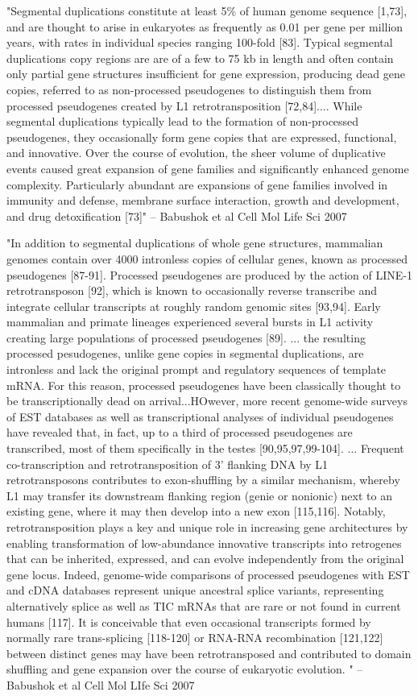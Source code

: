 \documentclass[10pt]{article}
\begin{document}
"Segmental duplications constitute at least 5\% of human genome sequence [1,73], and are thought to arise in eukaryotes as frequently as 0.01 per gene per million years, with rates in individual species ranging 100-fold [83].  Typical segmental duplications copy regions are are of a few to 75 kb in length and often contain only partial gene structures insufficient for gene expression, producing dead gene copies, referred to as non-processed pseudogenes to distinguish them from processed pseudogenes created by L1 retrotransposition [72,84].... While segmental duplications typically lead to the formation of non-processed pseudogenes, they occasionally form gene copies that are expressed, functional, and innovative.  Over the course of evolution, the sheer volume of duplicative events caused great expansion of gene families and significantly enhanced genome complexity.  Particularly abundant are expansions of gene families involved in immunity and defense, membrane surface interaction, growth and development, and drug detoxification [73]"  -- Babushok et al Cell Mol Life Sci 2007

"In addition to segmental duplications of whole gene structures, mammalian genomes contain over 4000 intronless copies of cellular genes, known as processed pseudogenes [87-91].  Processed pseudogenes are produced by the action of LINE-1 retrotransposon [92], which is known to occasionally reverse transcribe and integrate cellular transcripts at roughly random genomic sites [93,94].  Early mammalian and primate lineages experienced several bursts in L1 activity creating large populations of processed pseudogenes [89].  ... the resulting processed pesudogenes, unlike gene copies in segmental duplications, are intronless and lack the original prompt and regulatory sequences of template mRNA.  For this reason, processed pseudogenes have been classically thought to be transcriptionally dead on arrival...HOwever, more recent genome-wide surveys of EST databases as well as transcriptional analyses of individual pseudogenes have revealed that, in fact, up to a third of processed pseudogenes are transcribed, most of them specifically in the testes [90,95,97,99-104]. ... Frequent co-transcription and retrotransposition of 3' flanking DNA by L1 retrotransposons contributes to exon-shuffling by a similar mechanism, whereby L1 may transfer its downstream flanking region (genie or nonionic) next to an existing gene, where it may then develop into a new exon [115,116].  Notably, retrotransposition plays a key and unique role in increasing gene architectures by enabling transformation of low-abundance innovative transcripts into retrogenes that can be inherited, expressed, and can evolve independently from the original gene locus.  Indeed, genome-wide comparisons of processed pseudogenes with EST and cDNA databases represent unique ancestral splice variants, representing alternatively splice as well as TIC mRNAs that are rare or not found in current humans [117].  It is conceivable that even occasional transcripts formed by normally rare trans-splicing [118-120] or RNA-RNA recombination [121,122] between distinct genes may have been retrotransposed and contributed to domain shuffling and gene expansion over the course of eukaryotic evolution.  "  -- Babushok et al Cell Mol LIfe Sci 2007
\end{document}
